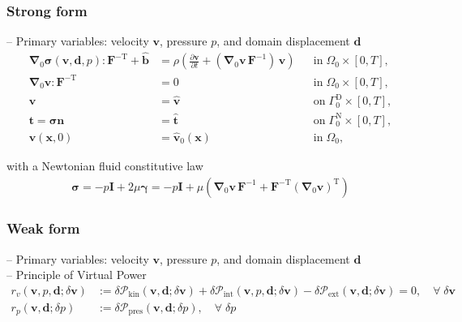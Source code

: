\documentclass[a4paper,12pt]{report}
\newcommand{\bs}[1]{\boldsymbol{#1}}
\newcommand{\Om}{\mathit{\Omega}}
\newcommand{\Gm}{\mathit{\Gamma}}
\begin{document}
\subsubsection{Strong form}
-- Primary variables: velocity $\bs{v}$, pressure $p$, and domain displacement $\bs{d}$
\begin{align}
\bs{\nabla}_{0} \bs{\sigma}(\bs{v},\bs{d},p) : \bs{F}^{-\mathrm{T}} + \hat{\bs{b}} &= \rho\left(\frac{\partial\bs{v}}{\partial t} + (\bs{\nabla}_0\bs{v}\,\bs{F}^{-1})\,\bs{v}\right) &&\text{in} \; \mathit{\Om}_0 \times [0, T], \label{eq:divsigma_ns_ale} \\
\bs{\nabla}_{0}\bs{v} : \bs{F}^{-\mathrm{T}} &= 0 &&\text{in} \; \mathit{\Om}_0 \times [0, T],\label{eq:divv_ns_ale}\\
\bs{v} &= \hat{\bs{v}} &&\text{on} \; \mathit{\Gm}_0^{\mathrm{D}} \times [0, T], \label{eq:bc_v_ns_ale}\\
\bs{t} = \bs{\sigma}\bs{n} &= \hat{\bs{t}} &&\text{on} \; \mathit{\Gm}_0^{\mathrm{N}} \times [0, T], \label{eq:bc_N_ns_ale}\\
\bs{v}(\bs{x},0) &= \hat{\bs{v}}_{0}(\bs{x}) &&\text{in} \; \mathit{\Om}_0, \label{eq:ini_v_ns_ale}
\end{align}

with a Newtonian fluid constitutive law
\begin{align}
\bs{\sigma} = -p \bs{I} + 2 \mu \bs{\gamma} = -p \bs{I} + \mu \left(\bs{\nabla}_0 \bs{v}\,\bs{F}^{-1} + \bs{F}^{-\mathrm{T}}(\bs{\nabla}_0 \bs{v})^{\mathrm{T}}\right)
\end{align}

\subsubsection{Weak form}

-- Primary variables: velocity $\bs{v}$, pressure $p$, and domain displacement $\bs{d}$\\

-- Principle of Virtual Power
\begin{align}
r_v(\bs{v},p,\bs{d};\delta\bs{v}) &:= \delta \mathcal{P}_{\mathrm{kin}}(\bs{v},\bs{d};\delta\bs{v}) + \delta \mathcal{P}_{\mathrm{int}}(\bs{v},p,\bs{d};\delta\bs{v}) - \delta \mathcal{P}_{\mathrm{ext}}(\bs{v},\bs{d};\delta\bs{v}) = 0, \quad \forall \; \delta\bs{v} \label{eq:res_v_fluid_ale}\\
r_p(\bs{v},\bs{d};\delta p) &:= \delta \mathcal{P}_{\mathrm{pres}}(\bs{v},\bs{d};\delta p), \quad \forall \; \delta p \label{eq:res_p_fluid_ale}
\end{align}
\end{document}
